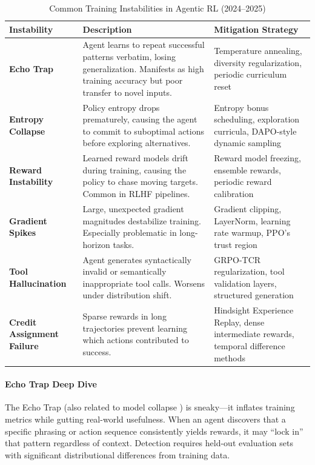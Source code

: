 \documentclass[12pt,a4paper]{report}
\theoremstyle{definition}
\begin{document}
\begin{table}[h]
\centering
\caption{Common Training Instabilities in Agentic RL (2024--2025)}
\label{tab:training_instabilities}
\small
\begin{tabular}{@{}p{2.5cm}>{\raggedright\arraybackslash}p{5.5cm}>{\raggedright\arraybackslash}p{4.5cm}@{}}
\toprule
\textbf{Instability} & \textbf{Description} & \textbf{Mitigation Strategy} \\
\midrule
\textbf{Echo Trap} & Agent learns to repeat successful patterns verbatim, losing generalization. Manifests as high training accuracy but poor transfer to novel inputs. & Temperature annealing, diversity regularization, periodic curriculum reset \\
\addlinespace
\textbf{Entropy Collapse} & Policy entropy drops prematurely, causing the agent to commit to suboptimal actions before exploring alternatives. & Entropy bonus scheduling, exploration curricula, DAPO-style dynamic sampling \\
\addlinespace
\textbf{Reward Instability} & Learned reward models drift during training, causing the policy to chase moving targets. Common in RLHF pipelines. & Reward model freezing, ensemble rewards, periodic reward calibration \\
\addlinespace
\textbf{Gradient Spikes} & Large, unexpected gradient magnitudes destabilize training. Especially problematic in long-horizon tasks. & Gradient clipping, LayerNorm, learning rate warmup, PPO's trust region \\
\addlinespace
\textbf{Tool Hallucination} & Agent generates syntactically invalid or semantically inappropriate tool calls. Worsens under distribution shift. & GRPO-TCR regularization, tool validation layers, structured generation \\
\addlinespace
\textbf{Credit Assignment Failure} & Sparse rewards in long trajectories prevent learning which actions contributed to success. & Hindsight Experience Replay, dense intermediate rewards, temporal difference methods \\
\bottomrule
\end{tabular}
\end{table}

\paragraph{Echo Trap Deep Dive} The Echo Trap (also related to model collapse \cite{shumailov2023curse}) is sneaky---it inflates training metrics while gutting real-world usefulness. When an agent discovers that a specific phrasing or action sequence consistently yields rewards, it may ``lock in'' that pattern regardless of context. Detection requires held-out evaluation sets with significant distributional differences from training data.
\end{document}
